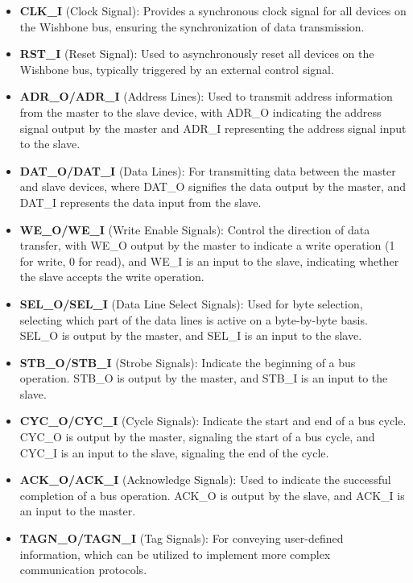 \documentclass[conference]{IEEEtran}
\begin{document}
\begin{itemize}
    \item \textbf{CLK\_I} (Clock Signal): Provides a synchronous clock signal for all devices on the Wishbone bus, ensuring the synchronization of data transmission.
    
    \item \textbf{RST\_I} (Reset Signal): Used to asynchronously reset all devices on the Wishbone bus, typically triggered by an external control signal.
    
    \item \textbf{ADR\_O/ADR\_I} (Address Lines): Used to transmit address information from the master to the slave device, with ADR\_O indicating the address signal output by the master and ADR\_I representing the address signal input to the slave.
    
    \item \textbf{DAT\_O/DAT\_I} (Data Lines): For transmitting data between the master and slave devices, where DAT\_O signifies the data output by the master, and DAT\_I represents the data input from the slave.
    
    \item \textbf{WE\_O/WE\_I} (Write Enable Signals): Control the direction of data transfer, with WE\_O output by the master to indicate a write operation (1 for write, 0 for read), and WE\_I is an input to the slave, indicating whether the slave accepts the write operation.
    
    \item \textbf{SEL\_O/SEL\_I} (Data Line Select Signals): Used for byte selection, selecting which part of the data lines is active on a byte-by-byte basis. SEL\_O is output by the master, and SEL\_I is an input to the slave.
    
    \item \textbf{STB\_O/STB\_I} (Strobe Signals): Indicate the beginning of a bus operation. STB\_O is output by the master, and STB\_I is an input to the slave.
    
    \item \textbf{CYC\_O/CYC\_I} (Cycle Signals): Indicate the start and end of a bus cycle. CYC\_O is output by the master, signaling the start of a bus cycle, and CYC\_I is an input to the slave, signaling the end of the cycle.
    
    \item \textbf{ACK\_O/ACK\_I} (Acknowledge Signals): Used to indicate the successful completion of a bus operation. ACK\_O is output by the slave, and ACK\_I is an input to the master.
    
    \item \textbf{TAGN\_O/TAGN\_I} (Tag Signals): For conveying user-defined information, which can be utilized to implement more complex communication protocols.
\end{itemize}
\end{document}
